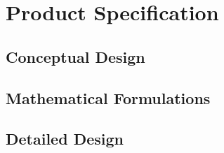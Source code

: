 \chapter{Product Specification}\label{ch:spec}

\section{Conceptual Design}



\section{Mathematical Formulations}


\section{Detailed Design}\label{sec:detailed_design}

